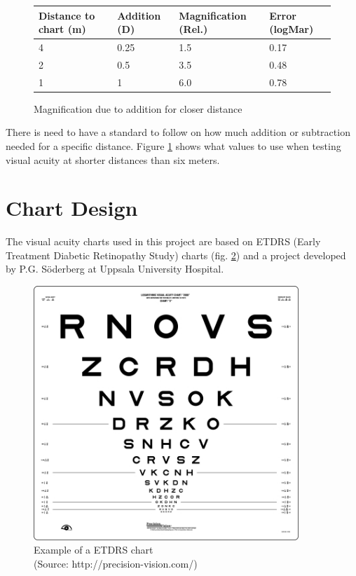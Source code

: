 \documentclass[12pt,a4paper,notitlepage]{report}
\begin{document}
\newpage
\begin{figure}[h]
\centering
\begin{tabular}{| l | l | l | l |}
    \hline
    Distance to chart (m) & Addition (D) & Magnification (Rel.) & Error (logMar) \\ \hline
    4                     & 0.25         & 1.5                  & 0.17           \\ \hline
    2                     & 0.5          & 3.5                  & 0.48           \\ \hline
    1                     & 1            & 6.0                  & 0.78           \\ 
    \hline
    \end{tabular}
    \caption{Magnification due to addition for closer distance\label{magtable}}
\end{figure}

There is need to have a standard to follow on how much addition or subtraction needed for a specific distance. Figure \ref{magtable} shows what values to use when testing visual acuity at shorter distances than six meters. \cite{PGSoderberg}

\section{Chart Design}
The visual acuity charts used in this project are based on ETDRS (Early Treatment Diabetic Retinopathy Study) charts (fig. \ref{fig:etdrs_chart}) \cite{Ferris} and a project developed by P.G. Söderberg \cite{PGSoderbergOral} at Uppsala University Hospital. 

\begin{figure}[ht!]
\centering
\includegraphics[width=100mm]{images/etdrs_chart.jpg}
\caption{Example of a ETDRS chart \\ (Source: http://precision-vision.com/)\label{fig:etdrs_chart}}
\end{figure} 
\end{document}
